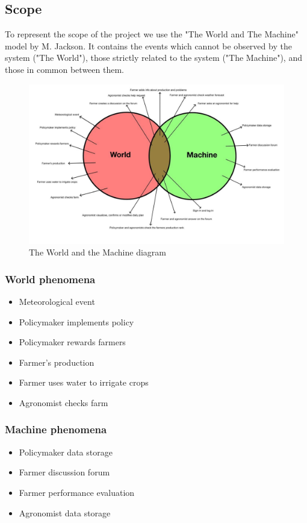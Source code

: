\subsection{Scope}
To represent the scope of the project we use the "The World and The Machine" model by M. Jackson. 
It contains the events which cannot be observed by the system ("The World"), 
those strictly related to the system ("The Machine"), and those in common between them. 

\newpage
\begin{figure}[H]
    \includegraphics[width=\textwidth,height=\textheight,keepaspectratio]{Images/WorldAndMachine.jpg}
    \caption{The World and the Machine diagram}
    \label{fig:WorldAndMachine}
\end{figure}

\subsubsection{World phenomena}
\begin{itemize}
    \item Meteorological event
    \item Policymaker implements policy
    \item Policymaker rewards farmers
    \item Farmer's production
    \item Farmer uses water to irrigate crops
    \item Agronomist checks farm
\end{itemize}

\subsubsection{Machine phenomena}
\begin{itemize}
    \item Policymaker data storage
    \item Farmer discussion forum
    \item Farmer performance evaluation
    \item Agronomist data storage
\end{itemize}

